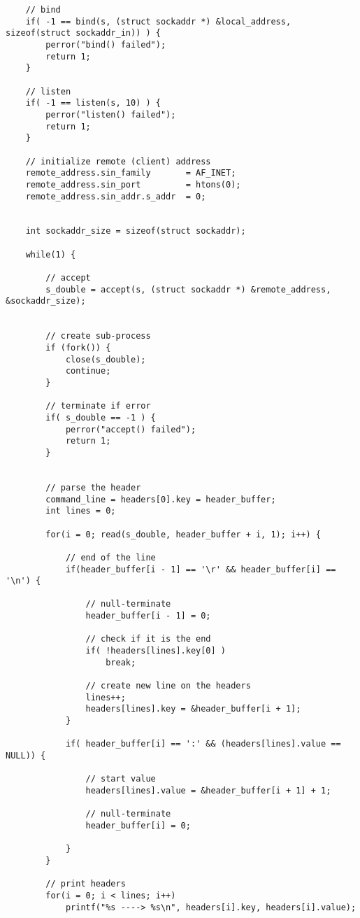 \begin{lstlisting}
    // bind
    if( -1 == bind(s, (struct sockaddr *) &local_address, sizeof(struct sockaddr_in)) ) {
        perror("bind() failed");
        return 1;
    }

    // listen
    if( -1 == listen(s, 10) ) {
        perror("listen() failed");
        return 1;
    }

    // initialize remote (client) address
    remote_address.sin_family       = AF_INET;
    remote_address.sin_port         = htons(0);
    remote_address.sin_addr.s_addr  = 0;


    int sockaddr_size = sizeof(struct sockaddr);

    while(1) {
        
        // accept
        s_double = accept(s, (struct sockaddr *) &remote_address, &sockaddr_size);


        // create sub-process
        if (fork()) {
            close(s_double);
            continue;
        }

        // terminate if error
        if( s_double == -1 ) {
            perror("accept() failed");
            return 1;
        }


        // parse the header
        command_line = headers[0].key = header_buffer;
        int lines = 0;

        for(i = 0; read(s_double, header_buffer + i, 1); i++) {

            // end of the line
            if(header_buffer[i - 1] == '\r' && header_buffer[i] == '\n') {
                
                // null-terminate
                header_buffer[i - 1] = 0;

                // check if it is the end
                if( !headers[lines].key[0] )
                    break;

                // create new line on the headers
                lines++;
                headers[lines].key = &header_buffer[i + 1];
            }

            if( header_buffer[i] == ':' && (headers[lines].value == NULL)) {
                
                // start value
                headers[lines].value = &header_buffer[i + 1] + 1;

                // null-terminate
                header_buffer[i] = 0;

            }
        }

        // print headers
        for(i = 0; i < lines; i++)
            printf("%s ----> %s\n", headers[i].key, headers[i].value);
        


\end{lstlisting}
